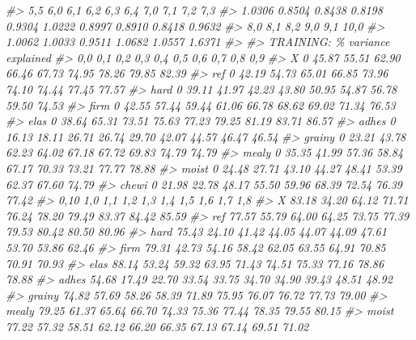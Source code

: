 \documentclass[
]{article}
\newenvironment{Shaded}{\begin{snugshade}}{\end{snugshade}}
\newcommand{\CommentTok}[1]{\textcolor[rgb]{0.56,0.35,0.01}{\textit{#1}}}
\begin{document}
\begin{Shaded}
\begin{Highlighting}[]
\CommentTok{\#\textgreater{}    5,5     6,0     6,1     6,2     6,3     6,4     7,0     7,1     7,2     7,3  }
\CommentTok{\#\textgreater{} 1.0306  0.8504  0.8438  0.8198  0.9304  1.0222  0.8997  0.8910  0.8418  0.9632  }
\CommentTok{\#\textgreater{}    8,0     8,1     8,2     9,0     9,1    10,0  }
\CommentTok{\#\textgreater{} 1.0062  1.0033  0.9511  1.0682  1.0557  1.6371  }
\CommentTok{\#\textgreater{} }
\CommentTok{\#\textgreater{} TRAINING: \% variance explained}
\CommentTok{\#\textgreater{}         0,0    0,1    0,2    0,3    0,4    0,5    0,6    0,7    0,8    0,9}
\CommentTok{\#\textgreater{} X         0  45.87  55.51  62.90  66.46  67.73  74.95  78.26  79.85  82.39}
\CommentTok{\#\textgreater{} ref       0  42.19  54.73  65.01  66.85  73.96  74.10  74.44  77.45  77.57}
\CommentTok{\#\textgreater{} hard      0  39.11  41.97  42.23  43.80  50.95  54.87  56.78  59.50  74.53}
\CommentTok{\#\textgreater{} firm      0  42.55  57.44  59.44  61.06  66.78  68.62  69.02  71.34  76.53}
\CommentTok{\#\textgreater{} elas      0  38.64  65.31  73.51  75.63  77.23  79.25  81.19  83.71  86.57}
\CommentTok{\#\textgreater{} adhes     0  16.13  18.11  26.71  26.74  29.70  42.07  44.57  46.47  46.54}
\CommentTok{\#\textgreater{} grainy    0  23.21  43.78  62.23  64.02  67.18  67.72  69.83  74.79  74.79}
\CommentTok{\#\textgreater{} mealy     0  35.35  41.99  57.36  58.84  67.17  70.33  73.21  77.77  78.88}
\CommentTok{\#\textgreater{} moist     0  24.48  27.71  43.10  44.27  48.41  53.39  62.37  67.60  74.79}
\CommentTok{\#\textgreater{} chewi     0  21.98  22.78  48.17  55.50  59.96  68.39  72.54  76.39  77.42}
\CommentTok{\#\textgreater{}          0,10    1,0    1,1    1,2    1,3    1,4    1,5    1,6    1,7    1,8}
\CommentTok{\#\textgreater{} X       83.18  34.20  64.12  71.71  76.24  78.20  79.49  83.37  84.42  85.59}
\CommentTok{\#\textgreater{} ref     77.57  55.79  64.00  64.25  73.75  77.39  79.53  80.42  80.50  80.96}
\CommentTok{\#\textgreater{} hard    75.43  24.10  41.42  44.05  44.07  44.09  47.61  53.70  53.86  62.46}
\CommentTok{\#\textgreater{} firm    79.31  42.73  54.16  58.42  62.05  63.55  64.91  70.85  70.91  70.93}
\CommentTok{\#\textgreater{} elas    88.14  53.24  59.32  63.95  71.43  74.51  75.33  77.16  78.86  78.88}
\CommentTok{\#\textgreater{} adhes   54.68  17.49  22.70  33.54  33.75  34.70  34.90  39.43  48.51  48.92}
\CommentTok{\#\textgreater{} grainy  74.82  57.69  58.26  58.39  71.89  75.95  76.07  76.72  77.73  79.00}
\CommentTok{\#\textgreater{} mealy   79.25  61.37  65.64  66.70  74.33  75.36  77.44  78.35  79.55  80.15}
\CommentTok{\#\textgreater{} moist   77.22  57.32  58.51  62.12  66.20  66.35  67.13  67.14  69.51  71.02}

\end{Highlighting}
\end{Shaded}
\end{document}
